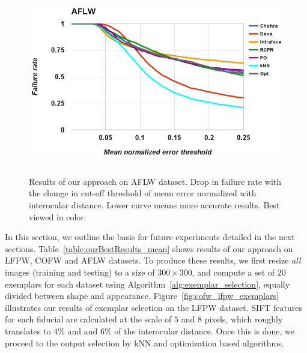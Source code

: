 \begin{figure}[!ht]
  \centering
  \includegraphics[width=5.6in,height=3.2in]{fid/figures/aflw_failure_rate_graph.png}
  \caption{Results of our approach on AFLW dataset.
  Drop in failure rate with the change in cut-off threshold of mean error normalized 
  with interocular distance. Lower curve means more accurate results. Best viewed in color.}
  \label{fig:graph_results}
\end{figure}

In this section, we outline the basis for future
experiments detailed in the next sections.
Table~\ref{table:ourBestResults_mean} shows
results of our approach on LFPW, COFW and AFLW datasets. To produce these results, we first
resize \emph{all} images (training and testing) to a size of $300 \times 300$, and 
compute a set of $20$ exemplars for each dataset using Algorithm~\ref{alg:exemplar_selection},
equally divided between shape and appearance. Figure~\ref{fig:cofw_lfpw_exemplars} illustrates our
results of exemplar selection on the LFPW dataset. SIFT features for each fiducial are calculated at
the scale of $5$ and $8$ pixels, which roughly translates to $4\%$ and and $6\%$ of the
interocular distance. Once this is done, we proceed to the output selection by kNN and optimization
based algorithms. 
  
